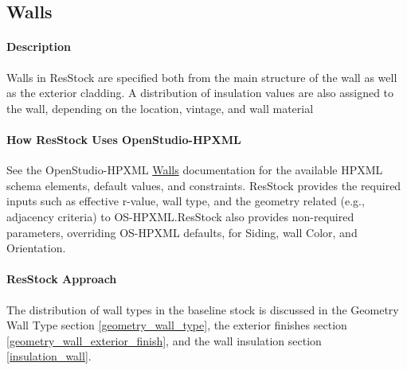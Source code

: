 \subsection{Walls}
\paragraph{Description} 

Walls in ResStock are specified both from the main structure of the wall as well as the exterior cladding. A distribution of insulation values are also assigned to the wall, depending on the location, vintage, and wall material

\paragraph{How ResStock Uses OpenStudio-HPXML}

See the OpenStudio-HPXML \href{https://openstudio-hpxml.readthedocs.io/en/v1.8.1/workflow_inputs.html#hpxml-walls}{Walls} documentation for the available HPXML schema elements, default values, and constraints. ResStock provides the required inputs such as effective r-value, wall type, and the geometry related (e.g., adjacency criteria) to OS-HPXML.ResStock also provides non-required parameters, overriding OS-HPXML defaults, for Siding, wall Color, and Orientation. 

\paragraph{ResStock Approach}
 
The distribution of wall types in the baseline stock is discussed in the Geometry Wall Type section \ref{geometry_wall_type}, the exterior finishes section \ref{geometry_wall_exterior_finish}, and the wall insulation section \ref{insulation_wall}. 


